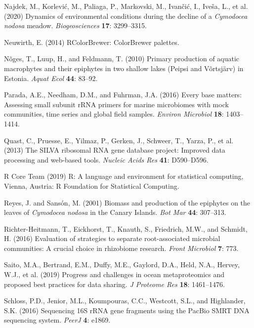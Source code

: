 \documentclass[
  12pt,
]{article}
\begin{document}
\leavevmode\hypertarget{ref-Najdek2020}{}%
Najdek, M., Korlević, M., Paliaga, P., Markovski, M., Ivančić, I.,
Iveša, L., et al. (2020) Dynamics of environmental conditions during the
decline of a \emph{Cymodocea nodosa} meadow. \emph{Biogeosciences}
\textbf{17}: 3299--3315.

\leavevmode\hypertarget{ref-Neuwirth2014}{}%
Neuwirth, E. (2014) RColorBrewer: ColorBrewer palettes.

\leavevmode\hypertarget{ref-Noges2010}{}%
Nõges, T., Luup, H., and Feldmann, T. (2010) Primary production of
aquatic macrophytes and their epiphytes in two shallow lakes (Peipsi and
Võrtsjärv) in Estonia. \emph{Aquat Ecol} \textbf{44}: 83--92.

\leavevmode\hypertarget{ref-Parada2016}{}%
Parada, A.E., Needham, D.M., and Fuhrman, J.A. (2016) Every base
matters: Assessing small subunit rRNA primers for marine microbiomes
with mock communities, time series and global field samples.
\emph{Environ Microbiol} \textbf{18}: 1403--1414.

\leavevmode\hypertarget{ref-Quast2013}{}%
Quast, C., Pruesse, E., Yilmaz, P., Gerken, J., Schweer, T., Yarza, P.,
et al. (2013) The SILVA ribosomal RNA gene database project: Improved
data processing and web-based tools. \emph{Nucleic Acids Res}
\textbf{41}: D590--D596.

\leavevmode\hypertarget{ref-RCoreTeam2019}{}%
R Core Team (2019) R: A language and environment for statistical
computing, Vienna, Austria: R Foundation for Statistical Computing.

\leavevmode\hypertarget{ref-Reyes2001}{}%
Reyes, J. and Sansón, M. (2001) Biomass and production of the epiphytes
on the leaves of \emph{Cymodocea nodosa} in the Canary Islands.
\emph{Bot Mar} \textbf{44}: 307--313.

\leavevmode\hypertarget{ref-Richter-Heitmann2016}{}%
Richter-Heitmann, T., Eickhorst, T., Knauth, S., Friedrich, M.W., and
Schmidt, H. (2016) Evaluation of strategies to separate root-associated
microbial communities: A crucial choice in rhizobiome research.
\emph{Front Microbiol} \textbf{7}: 773.

\leavevmode\hypertarget{ref-Saito2019}{}%
Saito, M.A., Bertrand, E.M., Duffy, M.E., Gaylord, D.A., Held, N.A.,
Hervey, W.J., et al. (2019) Progress and challenges in ocean
metaproteomics and proposed best practices for data sharing. \emph{J
Proteome Res} \textbf{18}: 1461--1476.

\leavevmode\hypertarget{ref-Schloss2016}{}%
Schloss, P.D., Jenior, M.L., Koumpouras, C.C., Westcott, S.L., and
Highlander, S.K. (2016) Sequencing 16S rRNA gene fragments using the
PacBio SMRT DNA sequencing system. \emph{PeerJ} \textbf{4}: e1869.
\end{document}
